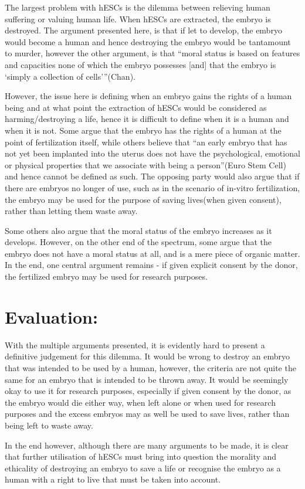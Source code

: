 \documentclass[11pt, a4]{article}
\begin{document}
		\bigbreak
		
		The largest problem with hESCs is the dilemma between relieving human suffering or valuing human life. When hESCs are extracted, the embryo is destroyed. The argument presented here, is that if let to develop, the embryo would become a human and hence destroying the embryo would be tantamount to murder, however the other argument, is that ``moral status is based on features and capacities none of which the embryo possesses [and] that the embryo is ‘simply a collection of cells’''(Chan). 
	
		\bigbreak
	
		However, the issue here is defining when an embryo gains the rights of a human being and at what point the extraction of hESCs would be	considered as harming/destroying a life, hence it is difficult to define when it is a human and when it is not. Some argue that the embryo has the rights of a human at the point of fertilization itself, while others believe that ``an early embryo that has not yet been implanted into the uterus does not have the psychological, emotional or physical properties that we associate with being a person''(Euro Stem Cell) and hence cannot be defined as such. The opposing party would also argue that if there are embryos no longer of use, such as in the scenario of in-vitro fertilization, the embryo may be used for the purpose of saving lives(when given consent), rather than letting them waste away.

		\bigbreak
	
		Some others also argue that the moral status of the embryo increases as it develops. However, on the other end of the spectrum, some argue that the embryo does not have a moral status at all, and is a mere piece of organic matter. In the end, one central argument remains - if given explicit consent by the donor, the fertilized embryo may be used for research purposes.
	
	\section{Evaluation:}
		With the multiple arguments presented, it is evidently hard to present a definitive judgement for this dilemma. It would be wrong to destroy an embryo that was intended to be used by a human, however, the criteria are not quite the same for an embryo that is intended to be thrown away. It would be seemingly okay to use it for research purposes, especially if given consent by the donor, as the embryo would die either way, when left alone or when used for research purposes and the excess embryos may as well be used to save lives, rather than being left to waste away.
		
		\bigbreak
		
		In the end however, although there are many arguments to be made, it is clear that further utilisation of hESCs must bring into question the morality and ethicality of destroying an embryo to save a life or recognise the embryo as a human with a right to live that must be taken into account.
\end{document}
